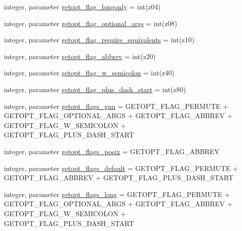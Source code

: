 \begin{DoxyCompactItemize}
\item 
integer, parameter \hyperlink{namespacem__getopt__long_a78dad148f97ee14b2dc1c1e3f66775a8}{getopt\+\_\+flag\+\_\+longonly} = int(z\textquotesingle{}04\textquotesingle{})
\item 
integer, parameter \hyperlink{namespacem__getopt__long_a5d97a0339a2798c3275ef32d5bac5407}{getopt\+\_\+flag\+\_\+optional\+\_\+args} = int(z\textquotesingle{}08\textquotesingle{})
\item 
integer, parameter \hyperlink{namespacem__getopt__long_a8ed12f1d43098e7e6cbe7f4a6b9a9352}{getopt\+\_\+flag\+\_\+require\+\_\+equivalents} = int(z\textquotesingle{}10\textquotesingle{})
\item 
integer, parameter \hyperlink{namespacem__getopt__long_a519f914b784104158b07034c85767007}{getopt\+\_\+flag\+\_\+abbrev} = int(z\textquotesingle{}20\textquotesingle{})
\item 
integer, parameter \hyperlink{namespacem__getopt__long_ae60135d11126a953a2bac414e62f57ac}{getopt\+\_\+flag\+\_\+w\+\_\+semicolon} = int(z\textquotesingle{}40\textquotesingle{})
\item 
integer, parameter \hyperlink{namespacem__getopt__long_a928e9e8b9d3688cd9c0fc38b33568da9}{getopt\+\_\+flag\+\_\+plus\+\_\+dash\+\_\+start} = int(z\textquotesingle{}80\textquotesingle{})
\item 
integer, parameter \hyperlink{namespacem__getopt__long_a5c591e4e0cabebe3bdb56263f6ad7a10}{getopt\+\_\+flags\+\_\+gnu} = G\+E\+T\+O\+P\+T\+\_\+\+F\+L\+A\+G\+\_\+\+P\+E\+R\+M\+U\+TE + G\+E\+T\+O\+P\+T\+\_\+\+F\+L\+A\+G\+\_\+\+O\+P\+T\+I\+O\+N\+A\+L\+\_\+\+A\+R\+GS + G\+E\+T\+O\+P\+T\+\_\+\+F\+L\+A\+G\+\_\+\+A\+B\+B\+R\+EV + G\+E\+T\+O\+P\+T\+\_\+\+F\+L\+A\+G\+\_\+\+W\+\_\+\+S\+E\+M\+I\+C\+O\+L\+ON + G\+E\+T\+O\+P\+T\+\_\+\+F\+L\+A\+G\+\_\+\+P\+L\+U\+S\+\_\+\+D\+A\+S\+H\+\_\+\+S\+T\+A\+RT
\item 
integer, parameter \hyperlink{namespacem__getopt__long_ab052891b2a58dcaa186b04aaf6d6e0a0}{getopt\+\_\+flags\+\_\+posix} = G\+E\+T\+O\+P\+T\+\_\+\+F\+L\+A\+G\+\_\+\+A\+B\+B\+R\+EV
\item 
integer, parameter \hyperlink{namespacem__getopt__long_a2756f79006f828de56abaf6ee45d2d69}{getopt\+\_\+flags\+\_\+default} = G\+E\+T\+O\+P\+T\+\_\+\+F\+L\+A\+G\+\_\+\+P\+E\+R\+M\+U\+TE + G\+E\+T\+O\+P\+T\+\_\+\+F\+L\+A\+G\+\_\+\+A\+B\+B\+R\+EV + G\+E\+T\+O\+P\+T\+\_\+\+F\+L\+A\+G\+\_\+\+P\+L\+U\+S\+\_\+\+D\+A\+S\+H\+\_\+\+S\+T\+A\+RT
\item 
integer, parameter \hyperlink{namespacem__getopt__long_a9c32005623bfe7b86c5b743d4a436247}{getopt\+\_\+flags\+\_\+long} = G\+E\+T\+O\+P\+T\+\_\+\+F\+L\+A\+G\+\_\+\+P\+E\+R\+M\+U\+TE + G\+E\+T\+O\+P\+T\+\_\+\+F\+L\+A\+G\+\_\+\+O\+P\+T\+I\+O\+N\+A\+L\+\_\+\+A\+R\+GS + G\+E\+T\+O\+P\+T\+\_\+\+F\+L\+A\+G\+\_\+\+A\+B\+B\+R\+EV + G\+E\+T\+O\+P\+T\+\_\+\+F\+L\+A\+G\+\_\+\+W\+\_\+\+S\+E\+M\+I\+C\+O\+L\+ON + G\+E\+T\+O\+P\+T\+\_\+\+F\+L\+A\+G\+\_\+\+P\+L\+U\+S\+\_\+\+D\+A\+S\+H\+\_\+\+S\+T\+A\+RT

\end{DoxyCompactItemize}
